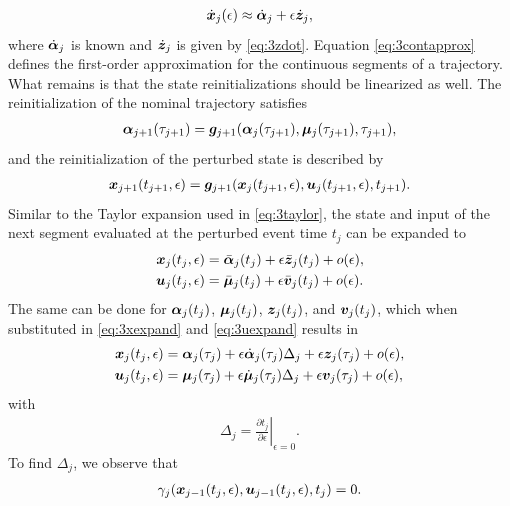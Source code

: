 \documentclass[../DC2017114Bouma.tex]{subfiles}
\begin{document}
\begin{align}
\dot{{\boldsymbol{x}}}_j(\epsilon) \approx \dot{\boldsymbol{\alpha}}_j + \epsilon\dot{{\boldsymbol{z}}}_j,\label{eq:3contapprox}
\end{align}
where $\dot{\boldsymbol{\alpha}}_j$ is known and $\dot{{\boldsymbol{z}}}_j$ is given by \eqref{eq:3zdot}. Equation \eqref{eq:3contapprox} defines the first-order approximation for the continuous segments of a trajectory. What remains is that the state reinitializations should be linearized as well. The reinitialization of the nominal trajectory satisfies
\begin{align}
\boldsymbol{\alpha}_{j+1}(\tau_{j+1}) = {\boldsymbol{g}}_{j+1}(\boldsymbol{\alpha}_j(\tau_{j+1}),\boldsymbol{\mu}_j(\tau_{j+1}),\tau_{j+1}),\label{eq:3g}
\end{align}
and the reinitialization of the perturbed state is described by
\begin{align}
{\boldsymbol{x}}_{j+1}(t_{j+1},\epsilon) = {\boldsymbol{g}}_{j+1}({\boldsymbol{x}}_j(t_{j+1},\epsilon),{\boldsymbol{u}}_j(t_{j+1},\epsilon),t_{j+1}).\label{eq:3gpert}
\end{align}
Similar to the Taylor expansion used in \eqref{eq:3taylor}, the state and input of the next segment evaluated at the perturbed event time $t_{j}$ can be expanded to
\begin{align}
{\boldsymbol{x}}_j(t_{j},\epsilon) &= \bar{\boldsymbol{\alpha}}_j(t_{j}) + \epsilon\bar{{\boldsymbol{z}}}_j(t_{j}) + o(\epsilon),\label{eq:3xexpand}\\
{\boldsymbol{u}}_j(t_{j},\epsilon) &= \bar{\boldsymbol{\mu}}_j(t_{j}) + \epsilon\bar{{\boldsymbol{v}}}_j(t_{j}) + o(\epsilon).\label{eq:3uexpand}
\end{align}
The same can be done for $\boldsymbol{\alpha}_j(t_{j})$, $\boldsymbol{\mu}_j(t_{j})$, ${\boldsymbol{z}}_j(t_{j})$, and ${\boldsymbol{v}}_j(t_{j})$, which when substituted in \eqref{eq:3xexpand} and \eqref{eq:3uexpand} results in
\begin{align}
{\boldsymbol{x}}_j(t_{j},\epsilon) &= \boldsymbol{\alpha}_j(\tau_j) + \epsilon\dot{\boldsymbol{\alpha}}_j(\tau_j)\Delta_j + \epsilon{\boldsymbol{z}}_j(\tau_j) + o(\epsilon),\label{eq:3xexpand2}\\
{\boldsymbol{u}}_j(t_{j},\epsilon) &= \boldsymbol{\mu}_j(\tau_j) + \epsilon\dot{\boldsymbol{\mu}}_j(\tau_j)\Delta_j + \epsilon{\boldsymbol{v}}_j(\tau_j) + o(\epsilon),\label{eq:3uexpand2}
\end{align}
with
\begin{align}
\Delta_{j} = \left.\frac{\partial t_{j}}{\partial\epsilon}\right|_{\epsilon=0}.\label{eq:3Delta}
\end{align}
To find $\Delta_{j}$, we observe that
\begin{align}
\gamma_j({\boldsymbol{x}}_{j-1}(t_{j},\epsilon),{\boldsymbol{u}}_{j-1}(t_{j},\epsilon),t_{j}) = 0.\label{eq:3gamma}
\end{align}
\end{document}
